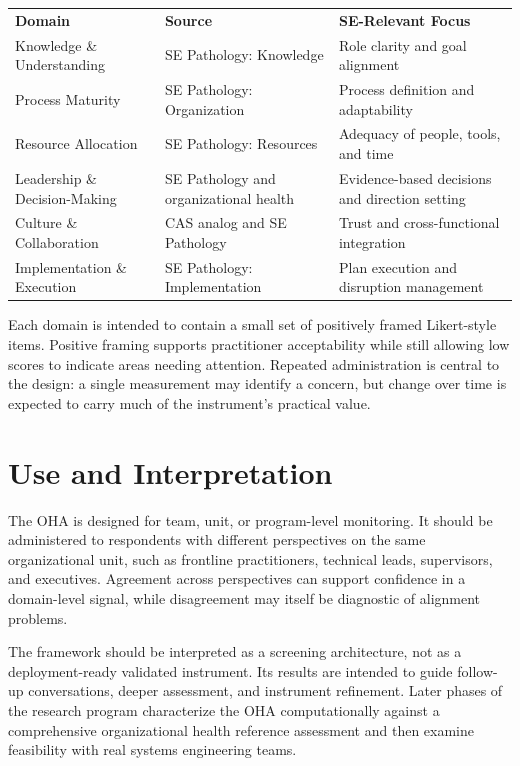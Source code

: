 \documentclass[11pt,letterpaper]{article}
\newcommand{\headingfont}{\sffamily}
\begin{document}
\begin{multicols*}{2}
\begingroup
\renewcommand{\arraystretch}{1.4}
\begin{tabularx}{\columnwidth}{@{}A{0.32\columnwidth}A{0.30\columnwidth}A{0.30\columnwidth}@{}}
    \headingfont\bfseries Domain &
    \headingfont\bfseries Source &
    \headingfont\bfseries SE-Relevant Focus \\
    Knowledge \& Understanding & SE Pathology: Knowledge & Role clarity and goal alignment \\
    Process Maturity & SE Pathology: Organization & Process definition and adaptability \\
    Resource Allocation & SE Pathology: Resources & Adequacy of people, tools, and time \\
    Leadership \& Decision-Making & SE Pathology and organizational health & Evidence-based decisions and direction setting \\
    Culture \& Collaboration & CAS analog and SE Pathology & Trust and cross-functional integration \\
    Implementation \& Execution & SE Pathology: Implementation & Plan execution and disruption management \\
\end{tabularx}
\label{tab:oha-domains}
\endgroup
\vspace{6pt}

Each domain is intended to contain a small set of positively framed Likert-style items. Positive framing supports practitioner acceptability while still allowing low scores to indicate areas needing attention. Repeated administration is central to the design: a single measurement may identify a concern, but change over time is expected to carry much of the instrument's practical value.

\section{Use and Interpretation}
The OHA is designed for team, unit, or program-level monitoring. It should be administered to respondents with different perspectives on the same organizational unit, such as frontline practitioners, technical leads, supervisors, and executives. Agreement across perspectives can support confidence in a domain-level signal, while disagreement may itself be diagnostic of alignment problems.

The framework should be interpreted as a screening architecture, not as a deployment-ready validated instrument. Its results are intended to guide follow-up conversations, deeper assessment, and instrument refinement. Later phases of the research program characterize the OHA computationally against a comprehensive organizational health reference assessment and then examine feasibility with real systems engineering teams.


\end{multicols*}
\end{document}
